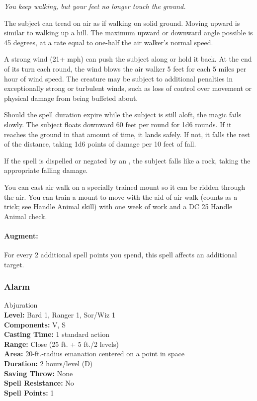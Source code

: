 \emph{You keep walking, but your feet no longer touch the ground.}

The subject can tread on air as if walking on solid ground. 
Moving upward is similar to walking up a hill. 
The maximum upward or downward angle possible is 45 degrees, at a rate equal to one-half the air walker's normal speed.

A strong wind (21+ mph) can push the subject along or hold it back. At the end of its turn each round, the wind blows the air walker 5 feet for each 5 miles per hour of wind speed. 
The creature may be subject to additional penalties in exceptionally strong or turbulent winds, such as loss of control over movement or physical damage from being buffeted about.

Should the spell duration expire while the subject is still aloft, the magic fails slowly. 
The subject floats downward 60 feet per round for 1d6 rounds. 
If it reaches the ground in that amount of time, it lands safely. 
If not, it falls the rest of the distance, taking 1d6 points of damage per 10 feet of fall. 

If the spell is dispelled or negated by an , the subject falls like a rock, taking the appropriate falling damage.

You can cast air walk on a specially trained mount so it can be ridden through the air. 
You can train a mount to move with the aid of air walk (counts as a trick; see Handle Animal skill) with one week of work and a DC 25 Handle Animal check.

\paragraph{Augment:} For every 2 additional spell points you spend, this spell affects an additional target.
\subsubsection{Alarm}
\label{Spell:Alarm}
Abjuration
\\ \textbf{Level:} Bard 1, Ranger 1, Sor/Wiz 1
\\ \textbf{Components:} V, S
\\ \textbf{Casting Time:} 1 standard action
\\ \textbf{Range:} Close (25 ft. + 5 ft./2 levels)
\\ \textbf{Area:} 20-ft.-radius emanation centered on a point in space
\\ \textbf{Duration:} 2 hours/level (D)
\\ \textbf{Saving Throw:} None
\\ \textbf{Spell Resistance:} No
\\ \textbf{Spell Points:} 1

